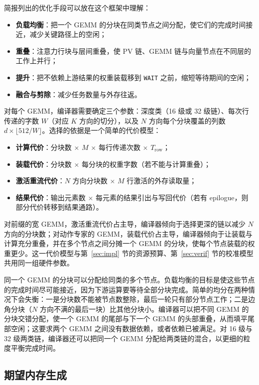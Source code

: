 \documentclass[a4paper,10.5pt]{ctexart}
\begin{document}
简报列出的优化手段可以放在这个框架中理解：
\begin{itemize}
  \item \textbf{负载均衡}：把一个 GEMM 的分块在同类节点之间分配，使它们的完成时间接近，减少关键路径上的空闲；
  \item \textbf{重叠}：注意力行块与层间重叠，使 PV 链、GEMM 链与向量节点在不同层的工作上并行；
  \item \textbf{提升}：把不依赖上游结果的权重装载移到 \texttt{WAIT} 之前，缩短等待期间的空闲；
  \item \textbf{融合与剪除}：减少任务数量与外存往返。
\end{itemize}

对每个 GEMM，编译器需要确定三个参数：深度类（16 级或 32 级链）、每次行传递的字数 $W$（对应 $K$ 方向的切分），以及 $N$ 方向每个分块覆盖的列数 $d\times\lfloor512/W\rfloor$。选择的依据是一个简单的代价模型：
\begin{itemize}
  \item \textbf{计算代价}：分块数 $\times$ $M$ $\times$ 每行传递次数 $\times$ $T_{\text{row}}$；
  \item \textbf{装载代价}：分块数 $\times$ 每分块的权重字数（若不能与计算重叠）；
  \item \textbf{激活重流代价}：$N$ 方向分块数 $\times$ $M$ 行激活的外存读取量；
  \item \textbf{结果代价}：输出元素数 $\times$ 每元素的结果引出与写回代价（若有 epilogue，则部分代价转移到结果通路）。
\end{itemize}
对前缀的宽 GEMM，激活重流代价占主导，编译器倾向于选择更深的链以减少 $N$ 方向的分块数；对动作专家的 GEMM，装载代价占主导，编译器倾向于让装载与计算充分重叠，并在多个节点之间分摊一个 GEMM 的分块，使每个节点装载的权重更少。这一代价模型与第~\ref{sec:impl} 节的资源预算、第~\ref{sec:verif} 节的校准模型共用同一组硬件参数。

同一个 GEMM 的分块可以分配给同类的多个节点。负载均衡的目标是使这些节点的完成时间尽可能接近，因为下游运算要等待全部分块完成。简单的均分在两种情况下会失衡：一是分块数不能被节点数整除，最后一轮只有部分节点工作；二是边角分块（$N$ 方向不满的最后一块）比其他分块小。编译器可以把不同 GEMM 的分块交错分配，使一个 GEMM 的尾部与下一个 GEMM 的头部重叠，从而填平尾部空闲；这要求两个 GEMM 之间没有数据依赖，或者依赖已被满足。对 16 级与 32 级两类链，编译器还可以把同一个 GEMM 分配给两类链的混合，以更细的粒度平衡完成时间。

\subsection{期望内存生成}\label{sec:expmem}
\end{document}
